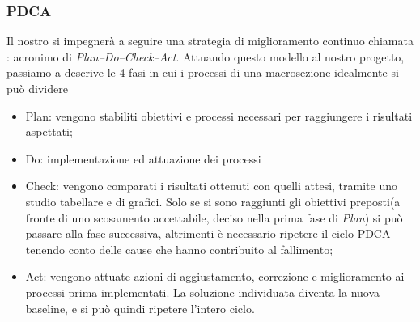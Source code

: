 \subsubsection{PDCA}
Il nostro  si impegnerà a seguire una strategia di miglioramento continuo chiamata  : acronimo di \textit{Plan–Do–Check–Act}. Attuando questo modello al nostro progetto, passiamo a descrive le 4 fasi in cui i processi di una macrosezione idealmente si può dividere
\begin{itemize}
				\item Plan: vengono stabiliti obiettivi e processi necessari per raggiungere i risultati aspettati;
				\item Do: implementazione ed attuazione dei processi
				\item Check: vengono comparati i risultati ottenuti con quelli attesi, tramite uno studio tabellare e di grafici. Solo se si sono raggiunti gli obiettivi preposti(a fronte di uno scosamento accettabile, deciso nella prima fase di \textit{Plan}) si può passare alla fase successiva, altrimenti è necessario ripetere il ciclo PDCA tenendo conto delle cause che hanno contribuito al fallimento;
				\item Act: vengono attuate azioni di aggiustamento, correzione e miglioramento ai processi prima implementati. La soluzione individuata diventa la nuova baseline, e si può quindi ripetere l'intero ciclo.
			\end{itemize}


